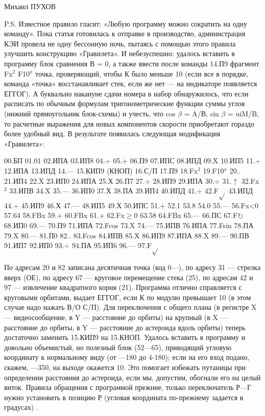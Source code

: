 \documentclass[11pt,a4paper,oneside]{article}
\def\FO{F$\circlearrowright$}
\begin{document}
Михаил ПУХОВ

P.S. Известное правило гласит: «Любую программу можно сократить на одну команду». Пока статья готовилась к отправке в производство, администрация КЭИ провела не одну бессонную ночь, пытаясь с помощью этого правила улучшить конструкцию «Гравилета». И небезуспешно: удалось вставить в программу блок сравнения В = 0, а также ввести после команды 14.П9 фрагмент Fx$^{2}$ F10$^{x}$ точка, проверяющий, чтобы К было меньше 10 (если все в порядке, команда «точка» восстанавливает стек, если же нет — на индикаторе	появляется ЕГГОГ). А буквально накануне сдачи номера в набор обнаружилось, что если расписать по обычным формулам тригонометрические функции суммы углов (нижний прямоугольник блок-схемы) и учесть, что cos $\beta$ = A/В, sin $\beta$ = uiM/B, то расчетные выражения для новых компонентов скорости приобретают гораздо более удобный вид. В результате появилась следующая модификация «Гравилета»:

00.БП 01.01 02.ИПА 03.ИП8	04.$\div$
05.+	06.П9 07.ИПС 08.ИПД 09.X
10.ИП5 11.$\div$ 12.ИПА 13.ИПД 14.—
15.КИП9 (КНОП) 16.С/П 17.П9 18.Fx$^{2}$
19.F10$^{x}$ 20.. 21.ИП4	22.X 23.ИП0
24.ИПА 25.Х 26.П7 27.$\div$ 28.ИП9
29.ИПА 30.$\div$ 31.$\uparrow$ 32.Fx$^{2}$ 33.ИПВ 34.X 35.— 36.ИП0 37.Х	38.ПА 39.ИП4
40.ИПД 41.$\div$ 42.F$\sqrt{}$ 43.ИПД 44.$\div$
45.ИП9 46.Х 47.— 48.ИП5 49.Х 50.ИПС 51.+ 52.1 53.8 54.0 55.— 56.Fx<0 57.64 58.FBx 59.+ 60.FBx 61.+ 62.Fx$\geq$0 63.58 64.FBx 65.— 66.ПС 67.\FO 68.ИП0 69.— 70.П9 71.ИПА 72.Fcos 73.X 74.—
75.ИПВ 76.ИПА 77.Fsin 78.ПА 79.X
80.— 81.П0 82.. 83.Fcos 84.ИПВ 85.X 86.ИП9 87.ИПА 88.X 89.— 90.ПВ
91.ИП7 92.ИП0 93.$\div$ 94.ПА 95.ИП6 96.— 97.F$\sqrt{}$

По адресам 20 и 82 записана десятичная точка (код 0—), по адресу 31 — стрелка вверх (ОЕ), по адресу 67 — круговое перемещение стека (25), по адресам 42 и 97 — извлечение квадратного корня (21). Программа отлично справляется с круговыми орбитами, выдает ЕГГОГ, если К по модулю превышает 10 (в этом случае надо нажать В/О С/П). Для переключения с общего плана (в регистре X — видеосообщение, в Y — расстояние до орбиты) на крупный (в X — расстояние до орбиты, в Y — расстояние до астероида вдоль орбиты) теперь достаточно заменить 15.КИП9 на 15.КНОП. Удалось вставить в программу и довольно объемистый, но полезный блок (52—65), приводящий угловую координату к нормальному виду (от —180 до 4-180); если на его вход подано, скажем, —350, на выходе окажется 10. Это помогает избежать путаницы при определении расстояния до астероида, если мы, допустим, обогнали его на целый виток. Правила обращения с программой прежние, только переключатель Р—Г нужно установить в позицию Р (угловая координата по-прежнему задается в градусах) .
\end{document}
